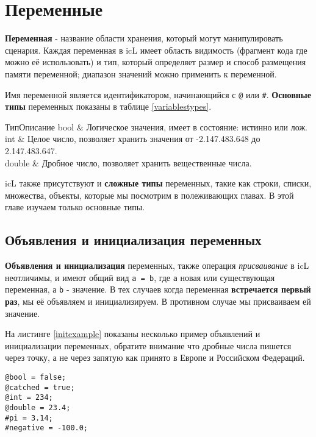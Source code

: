\documentclass[a4paper, 14pt]{extarticle}
\begin{document}
\newpage
\section{Переменные}

\textbf{Переменная} - название области хранения, который могут манипулировать сценария. Каждая переменная в icL имеет область видимость (фрагмент кода где можно её использовать) и тип, который определяет размер и способ размещения памяти переменной; диапазон значений можно применить к переменной.

Имя переменной является идентификатором, начинающийся с \lstinline`@` или {\color{blue2}\lstinline`#`}.
\textbf{Основные типы} переменных показаны в таблице \ref{variablestypes}.

%
{Тип}{Описание}%
{
	bool & Логическое значения, имеет в состояние: истинно или лож. \\ \hline
	int & Целое число, позволяет хранить значения от -2.147.483.648 до 2.147.483.647. \\ \hline
	double & Дробное число, позволяет хранить вещественные числа. \\
}

icL также присутствуют и \textbf{сложные типы} переменных, такие как строки, списки, множества, объекты, которые мы посмотрим в полеживающих главах. В этой главе изучаем только основные типы.

\subsection{Объявления и инициализация переменных}

\textbf{Объявления и инициализация} переменных, также операция \textit{присваивание} в icL неотличимы, и имеют общий вид \lstinline`a = b`, где \lstinline`a` новая или существующая переменная, а \lstinline`b` - значение. В тех случаев когда переменная \textbf{встречается первый раз}, мы её объявляем и инициализируем. В противном случае мы присваиваем ей значение.

На листинге \ref{initexample} показаны несколько пример объявлений и инициализации переменных, обратите внимание что дробные числа пишется через точку, а не через запятую как принято в Европе и Российском Федераций.

\begin{lstlisting}[caption=Пример объявлений и инициализации переменных,label=initexample]
@bool = false;
@catched = true;
@int = 234;
@double = 23.4;
#pi = 3.14;
#negative = -100.0;
\end{lstlisting}
\end{document}

